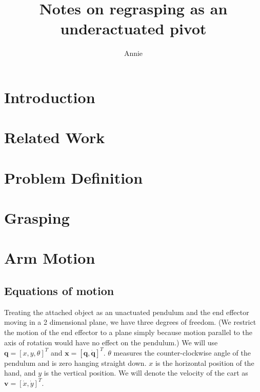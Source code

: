 \documentclass{article}
\begin{document}
\title{Notes on regrasping as an underactuated pivot}
\author{Annie}
\maketitle


\providecommand{\abs}[1]{\left\vert#1\right\vert}
\providecommand{\norm}[1]{\left\Vert#1\right\Vert}

\section{Introduction}

\section{Related Work}

\section{Problem Definition}

\section{Grasping}

\section{Arm Motion}

\subsection{Equations of motion}

Treating the attached object as an unactuated pendulum and the end
effector moving in a 2 dimensional plane, we have three degrees of
freedom. (We restrict the motion of the end effector to a plane simply
because motion parallel to the axis of rotation would have no effect
on the pendulum.) We will use $\mathbf{q} = [x,y,\theta]^T$ and
$\mathbf{x} =[\mathbf{q},\mathbf{\dot{q}}]^T$. $\theta$ measures the
counter-clockwise angle of the pendulum and is zero hanging straight
down. $x$ is the horizontal position of the hand, and $y$ is the
vertical position. We will denote the velocity of the cart as $\mathbf{v} = [\dot{x},\dot{y}]^T$. \\
\end{document}
